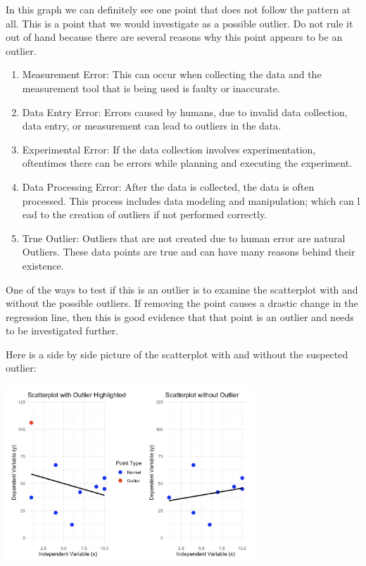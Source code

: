 \documentclass[
  letterpaper,
  DIV=11,
  numbers=noendperiod]{scrreprt}
\begin{document}
In this graph we can definitely see one point that does not follow the
pattern at all. This is a point that we would investigate as a possible
outlier. Do not rule it out of hand because there are several reasons
why this point appears to be an outlier.

\begin{enumerate}
\def\labelenumi{\arabic{enumi}.}
\item
  Measurement Error: This can occur when collecting the data and the
  measurement tool that is being used is faulty or inaccurate.
\item
  Data Entry Error: Errors caused by humans, due to invalid data
  collection, data entry, or measurement can lead to outliers in the
  data.
\item
  Experimental Error: If the data collection involves experimentation,
  oftentimes there can be errors while planning and executing the
  experiment.
\item
  Data Processing Error: After the data is collected, the data is often
  processed. This process includes data modeling and manipulation; which
  can l ead to the creation of outliers if not performed correctly.
\item
  True Outlier: Outliers that are not created due to human error are
  natural Outliers. These data points are true and can have many reasons
  behind their existence.
\end{enumerate}

One of the ways to test if this is an outlier is to examine the
scatterplot with and without the possible outliers. If removing the
point causes a drastic change in the regression line, then this is good
evidence that that point is an outlier and needs to be investigated
further.

Here is a side by side picture of the scatterplot with and without the
suspected outlier:

\includegraphics[width=0.7\textwidth,height=\textheight]{./images/ROP_6.jpg}
\end{document}
